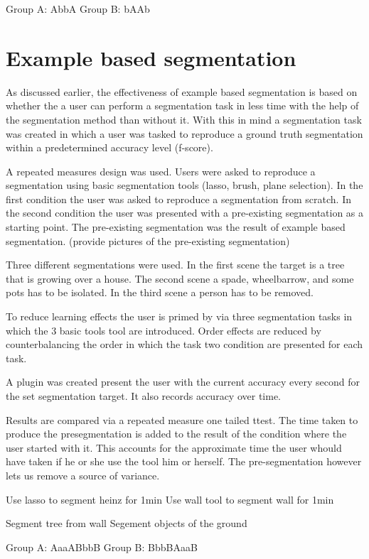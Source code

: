 Group A: AbbA
Group B: bAAb

\section{Example based segmentation}

As discussed earlier, the effectiveness of example based segmentation is based on whether the a user can perform a segmentation task in less time with the help of the segmentation method than without it. With this in mind a segmentation task was created in which a user was tasked to reproduce a ground truth segmentation within a predetermined accuracy level (f-score).

A repeated measures design was used. Users were asked to reproduce a segmentation using basic segmentation tools (lasso, brush, plane selection). In the first condition the user was asked to reproduce a segmentation from scratch. In the second condition the user was presented with a pre-existing segmentation as a starting point. The pre-existing segmentation was the result of example based segmentation. (provide pictures of the pre-existing segmentation)

Three different segmentations were used. In the first scene the target is a tree that is growing over a house. The second scene a spade, wheelbarrow, and some pots has to be isolated. In the third scene a person has to be removed.

To reduce learning effects the user is primed by via three segmentation tasks in which the 3 basic tools tool are introduced. Order effects are reduced by counterbalancing the order in which the task two condition are presented for each task.

A plugin was created present the user with the current accuracy every second for the set segmentation target. It also records accuracy over time.

Results are compared via a repeated measure one tailed ttest. The time taken to produce the presegmentation is added to the result of the condition where the user started with it. This accounts for the approximate time the user whould have taken if he or she use the tool him or herself. The pre-segmentation however lets us remove a source of variance.

Use lasso to segment heinz for 1min
Use wall tool to segment wall for 1min

Segment tree from wall
Segement objects of the ground

Group A: AaaABbbB
Group B: BbbBAaaB


